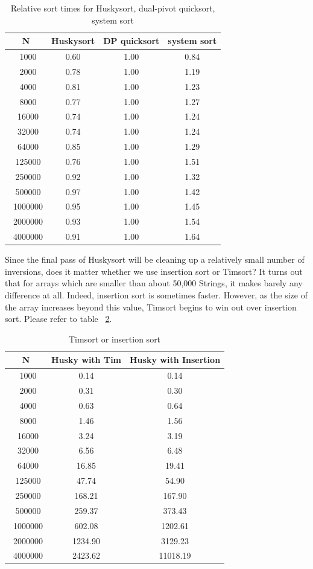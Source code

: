 \documentclass[acmtog]{acmart}
\begin{document}
\begin{table}
  \caption{Relative sort times for Huskysort, dual-pivot quicksort, system sort}
  \label{tab:HSComp}
  \begin{tabular}{cccc}
    \toprule
   N&Huskysort&DP quicksort&system sort\\
    \midrule
    \ 1000&0.60&	1.00&0.84\\
\ 2000&0.78&	1.00&1.19\\
\ 4000&0.81&	1.00&1.23\\
\ 8000&0.77&	1.00&1.27\\
\ 16000&0.74&1.00&1.24\\
\ 32000&0.74	&1.00&1.24\\
\ 64000&0.85	&1.00&1.29\\
\ 125000&0.76&1.00&1.51\\
\ 250000&0.92&1.00&1.32\\
\ 500000&0.97&1.00&1.42\\
\ 1000000&0.95&1.00&1.45\\
\ 2000000&0.93&1.00&1.54\\
\ 4000000&0.91&1.00&1.64\\

    \bottomrule
  \end{tabular}
\end{table}
Since the final pass of Huskysort will be cleaning up a relatively small number of inversions, does it matter whether we use insertion sort or Timsort? It turns out that for arrays which are smaller than about 50,000 Strings, it makes barely any difference at all.
Indeed, insertion sort is sometimes faster.
However, as the size of the array increases beyond this value, Timsort begins to win out over insertion sort. Please refer to table ~\ref{tab:TimvsInsertion}.

 \begin{table}
  \caption{Timsort or insertion sort}
  \label{tab:TimvsInsertion}
  \begin{tabular}{ccc}
    \toprule
    N & Husky with Tim & Husky with Insertion\\
    \midrule
    \ 1000&0.14&0.14 \\
\ 2000&0.31&0.30 \\
\ 4000&0.63&0.64 \\
\ 8000&1.46&1.56 \\
\ 16000&3.24&3.19 \\
\ 32000&6.56&6.48 \\
\ 64000&16.85&19.41 \\
\ 125000&47.74&54.90 \\
\ 250000&168.21&167.90 \\
\ 500000&259.37&373.43 \\
\ 1000000&602.08&1202.61 \\
\ 2000000&1234.90&3129.23 \\
\ 4000000&2423.62&11018.19 \\

    \bottomrule
  \end{tabular}
\end{table}
\end{document}
